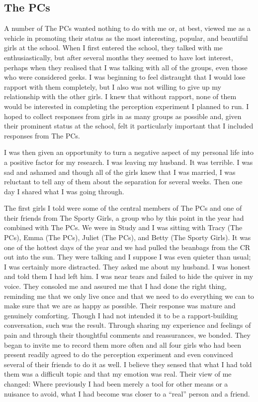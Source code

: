 \subsection{The PCs}
A number of The PCs wanted nothing to do with me or, at best, viewed me as a vehicle in promoting their status as the most interesting, popular, and beautiful girls at the school. When I first entered the school, they talked with me enthusiastically, but after several months they seemed to have lost interest, perhaps when they realised that I was talking with all of the groups, even those who were considered geeks. I was beginning to feel distraught that I would lose rapport with them completely, but I also was not willing to give up my relationship with the other girls. I knew that without rapport, none of them would be interested in completing the perception experiment I planned to run. I hoped to collect responses from girls in as many groups as possible and, given their prominent status at the school, felt it particularly important that I included responses from The PCs.

I was then given an opportunity to turn a negative aspect of my personal life into a positive factor for my research. I was leaving my husband. It was terrible. I was sad and ashamed and though all of the girls knew that I was married, I was reluctant to tell any of them about the separation for several weeks. Then one day I shared what I was going through. 

The first girls I told were some of the central members of The PCs and one of their friends from The Sporty Girls, a group who by this point in the year had combined with The PCs. We were in Study and I was sitting with Tracy (The PCs), Emma (The PCs), Juliet (The PCs), and Betty (The Sporty Girls). It was one of the hottest days of the year and we had pulled the beanbags from the CR out into the sun. They were talking and I suppose I was even quieter than usual; I was certainly more distracted. They asked me about my husband. I was honest and told them I had left him. I was near tears and failed to hide the quiver in my voice. They consoled me and assured me that I had done the right thing, reminding me that we only live once and that we need to do everything we can to make sure that we are as happy as possible. Their response was mature and genuinely comforting. Though I had not intended it to be a rapport-building conversation, such was the result. Through sharing my experience and feelings of pain and through their thoughtful comments and reassurances, we bonded. They began to invite me to record them more often and all four girls who had been present readily agreed to do the perception experiment and even convinced several of their friends to do it as well. I believe they sensed that what I had told them was a difficult topic and that my emotion was real. Their view of me changed: Where previously I had been merely a tool for other means or a nuisance to avoid, what I had become was closer to a ``real'' person and a friend.

